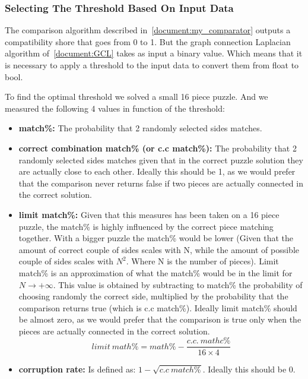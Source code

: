 \documentclass[epsfig,a4paper,11pt,titlepage,twoside,openany]{article}
\begin{document}
\subsubsection{Selecting The Threshold Based On Input Data}

The comparison algorithm described in~\cref{document:my_comparator} outputs a compatibility
shore that goes from 0 to 1.\newline
But the graph connection Laplacian algorithm of~\cref{document:GCL} takes as input a binary value.
Which means that it is necessary to apply a threshold to the input
data to convert them from float to bool.

To find the optimal threshold we solved a small 16 piece puzzle.
And we measured the following 4 values in function of the threshold:

\begin{itemize}
  \item \textbf{match\%:}\newline
  The probability that 2 randomly selected sides matches.
  
  \item \textbf{correct combination match\% (or c.c match\%):}\newline
  The probability that 2 randomly selected sides matches given that in the correct puzzle
  solution they are actually close to each other. Ideally this should be 1, as we would prefer
  that the comparison never returns false if two pieces are actually connected in the correct solution.
  
  \item \textbf{limit match\%:}\newline
  Given that this measures has been taken on a 16 piece puzzle,
  the match\% is highly influenced by the correct piece matching together.
  With a bigger puzzle the match\% would be lower (Given that the amount
  of correct couple of sides scales with N, while the amount of
  possible couple of sides scales with \(N^2\). Where N is the number of pieces).\newline
  Limit match\% is an approximation of what the match\%
  would be in the limit for \(N \rightarrow + \infty\).
  This value is obtained by subtracting to match\%
  the probability of choosing randomly the correct side,
  multiplied by the probability that the comparison returns true
  (which is c.c match\%).\newline
  Ideally limit match\% should be almost zero, as we would prefer that the comparison is true only when
  the pieces are actually connected in the correct solution.
  \[limit \: math\% = math\% - \frac{c.c. \: mathc\%}{16 \times 4}\]
  
  \item \textbf{corruption rate:}\newline
  Is defined as: \(1-\sqrt{c.c \: match\%}\). Ideally this should be 0.

\end{itemize}
\end{document}
